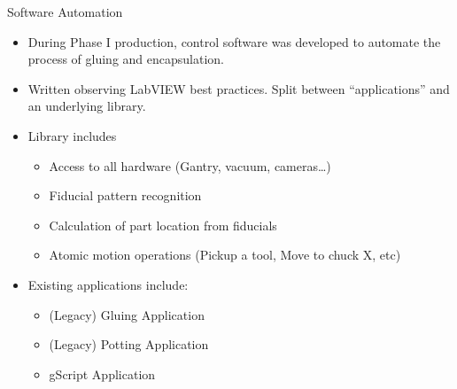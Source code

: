 \documentclass[english,aspectratio=43,8pt]{beamer}
\begin{document}
\begin{frame}{Software Automation}
    \begin{itemize}
        \item During Phase I production, control software was developed to automate the process of gluing and encapsulation.
        \item Written observing LabVIEW best practices. Split between ``applications'' and an underlying library.
        \item Library includes
          \begin{itemize}
              \item Access to all hardware (Gantry, vacuum, cameras\ldots)
              \item Fiducial pattern recognition
              \item Calculation of part location from fiducials
              \item Atomic motion operations (Pickup a tool, Move to chuck X, etc)
          \end{itemize}
        \item Existing applications include:
            \begin{itemize}
                \item (Legacy) Gluing Application
                \item (Legacy) Potting Application
                \item gScript Application
            \end{itemize}
    \end{itemize}
\end{frame}
\end{document}
